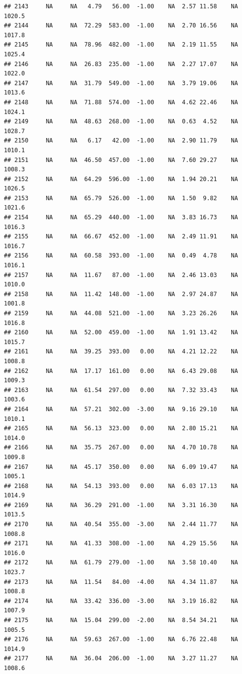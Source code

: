 \documentclass{article}\usepackage{graphicx, color}
\makeatletter
\newenvironment{kframe}{%
 \def\at@end@of@kframe{}%
 \ifinner\ifhmode%
  \def\at@end@of@kframe{\end{minipage}}%
  \begin{minipage}{\columnwidth}%
 \fi\fi%
 \def\FrameCommand##1{\hskip\@totalleftmargin \hskip-\fboxsep
 \colorbox{shadecolor}{##1}\hskip-\fboxsep
     \hskip-\linewidth \hskip-\@totalleftmargin \hskip\columnwidth}%
 \MakeFramed {\advance\hsize-\width
   \@totalleftmargin\z@ \linewidth\hsize
   \@setminipage}}%
 {\par\unskip\endMakeFramed%
 \at@end@of@kframe}
\newenvironment{knitrout}{}{} %
\makeatother
\begin{document}
\begin{knitrout}
\begin{kframe}
\begin{verbatim}
## 2143     NA     NA   4.79   56.00  -1.00    NA  2.57 11.58    NA 1020.5
## 2144     NA     NA  72.29  583.00  -1.00    NA  2.70 16.56    NA 1017.8
## 2145     NA     NA  78.96  482.00  -1.00    NA  2.19 11.55    NA 1025.4
## 2146     NA     NA  26.83  235.00  -1.00    NA  2.27 17.07    NA 1022.0
## 2147     NA     NA  31.79  549.00  -1.00    NA  3.79 19.06    NA 1013.6
## 2148     NA     NA  71.88  574.00  -1.00    NA  4.62 22.46    NA 1024.1
## 2149     NA     NA  48.63  268.00  -1.00    NA  0.63  4.52    NA 1028.7
## 2150     NA     NA   6.17   42.00  -1.00    NA  2.90 11.79    NA 1010.1
## 2151     NA     NA  46.50  457.00  -1.00    NA  7.60 29.27    NA 1008.3
## 2152     NA     NA  64.29  596.00  -1.00    NA  1.94 20.21    NA 1026.5
## 2153     NA     NA  65.79  526.00  -1.00    NA  1.50  9.82    NA 1021.6
## 2154     NA     NA  65.29  440.00  -1.00    NA  3.83 16.73    NA 1016.3
## 2155     NA     NA  66.67  452.00  -1.00    NA  2.49 11.91    NA 1016.7
## 2156     NA     NA  60.58  393.00  -1.00    NA  0.49  4.78    NA 1016.1
## 2157     NA     NA  11.67   87.00  -1.00    NA  2.46 13.03    NA 1010.0
## 2158     NA     NA  11.42  148.00  -1.00    NA  2.97 24.87    NA 1001.8
## 2159     NA     NA  44.08  521.00  -1.00    NA  3.23 26.26    NA 1016.8
## 2160     NA     NA  52.00  459.00  -1.00    NA  1.91 13.42    NA 1015.7
## 2161     NA     NA  39.25  393.00   0.00    NA  4.21 12.22    NA 1008.8
## 2162     NA     NA  17.17  161.00   0.00    NA  6.43 29.08    NA 1009.3
## 2163     NA     NA  61.54  297.00   0.00    NA  7.32 33.43    NA 1003.6
## 2164     NA     NA  57.21  302.00  -3.00    NA  9.16 29.10    NA 1010.1
## 2165     NA     NA  56.13  323.00   0.00    NA  2.80 15.21    NA 1014.0
## 2166     NA     NA  35.75  267.00   0.00    NA  4.70 10.78    NA 1009.8
## 2167     NA     NA  45.17  350.00   0.00    NA  6.09 19.47    NA 1005.1
## 2168     NA     NA  54.13  393.00   0.00    NA  6.03 17.13    NA 1014.9
## 2169     NA     NA  36.29  291.00  -1.00    NA  3.31 16.30    NA 1013.5
## 2170     NA     NA  40.54  355.00  -3.00    NA  2.44 11.77    NA 1008.8
## 2171     NA     NA  41.33  308.00  -1.00    NA  4.29 15.56    NA 1016.0
## 2172     NA     NA  61.79  279.00  -1.00    NA  3.58 10.40    NA 1023.7
## 2173     NA     NA  11.54   84.00  -4.00    NA  4.34 11.87    NA 1008.8
## 2174     NA     NA  33.42  336.00  -3.00    NA  3.19 16.82    NA 1007.9
## 2175     NA     NA  15.04  299.00  -2.00    NA  8.54 34.21    NA 1005.5
## 2176     NA     NA  59.63  267.00  -1.00    NA  6.76 22.48    NA 1014.9
## 2177     NA     NA  36.04  206.00  -1.00    NA  3.27 11.27    NA 1008.6

\end{verbatim}
\end{kframe}
\end{knitrout}
\end{document}
